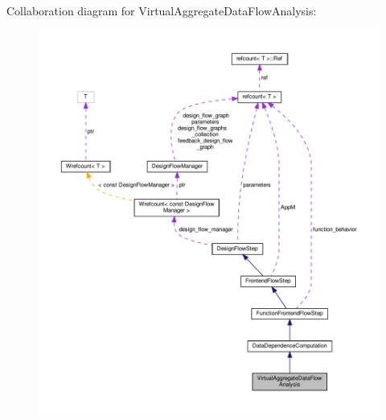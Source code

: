 Collaboration diagram for Virtual\+Aggregate\+Data\+Flow\+Analysis\+:
\nopagebreak
\begin{figure}[H]
\begin{center}
\leavevmode
\includegraphics[width=350pt]{d7/df8/classVirtualAggregateDataFlowAnalysis__coll__graph}
\end{center}
\end{figure}
